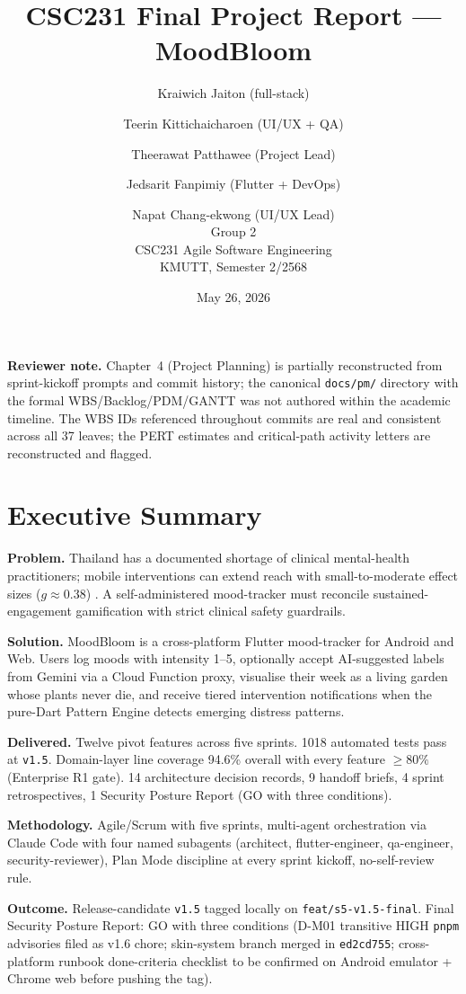\documentclass[11pt,a4paper]{article}
\title{CSC231 Final Project Report --- MoodBloom}
\author{
  Kraiwich Jaiton (full-stack) \and
  Teerin Kittichaicharoen (UI/UX + QA) \and
  Theerawat Patthawee (Project Lead) \and
  Jedsarit Fanpimiy (Flutter + DevOps) \and
  Napat Chang-ekwong (UI/UX Lead) \\[1ex]
  \small Group 2 \\
  \small CSC231 Agile Software Engineering \\
  \small KMUTT, Semester 2/2568
}
\date{May 26, 2026}
\begin{document}
\maketitle
\thispagestyle{empty}
\newpage

\noindent\textbf{Reviewer note.} Chapter~4 (Project Planning) is partially
reconstructed from sprint-kickoff prompts and commit history; the canonical
\texttt{docs/pm/} directory with the formal WBS/Backlog/PDM/GANTT was not
authored within the academic timeline. The WBS IDs referenced throughout
commits are real and consistent across all 37 leaves; the PERT estimates and
critical-path activity letters are reconstructed and flagged.

\tableofcontents
\newpage

\section*{Executive Summary}

\textbf{Problem.} Thailand has a documented shortage of clinical
mental-health practitioners; mobile interventions can extend reach with
small-to-moderate effect sizes ($g \approx 0.38$)
\autocite{firth2017meta}. A self-administered mood-tracker must
reconcile sustained-engagement gamification with strict clinical safety
guardrails.

\textbf{Solution.} MoodBloom is a cross-platform Flutter mood-tracker for
Android and Web. Users log moods with intensity 1--5, optionally accept
AI-suggested labels from Gemini via a Cloud Function proxy, visualise
their week as a living garden whose plants never die, and receive tiered
intervention notifications when the pure-Dart Pattern Engine detects
emerging distress patterns.

\textbf{Delivered.} Twelve pivot features across five sprints. 1018
automated tests pass at \texttt{v1.5}. Domain-layer line coverage 94.6\%
overall with every feature $\geq 80\%$ (Enterprise R1 gate). 14
architecture decision records, 9 handoff briefs, 4 sprint retrospectives,
1 Security Posture Report (GO with three conditions).

\textbf{Methodology.} Agile/Scrum with five sprints, multi-agent
orchestration via Claude Code with four named subagents (architect,
flutter-engineer, qa-engineer, security-reviewer), Plan Mode discipline
at every sprint kickoff, no-self-review rule.

\textbf{Outcome.} Release-candidate \texttt{v1.5} tagged locally on
\texttt{feat/s5-v1.5-final}. Final Security Posture Report: GO with
three conditions (D-M01 transitive HIGH \texttt{pnpm} advisories filed
as v1.6 chore; skin-system branch merged in \texttt{ed2cd755};
cross-platform runbook done-criteria checklist to be confirmed on
Android emulator + Chrome web before pushing the tag).
\end{document}
